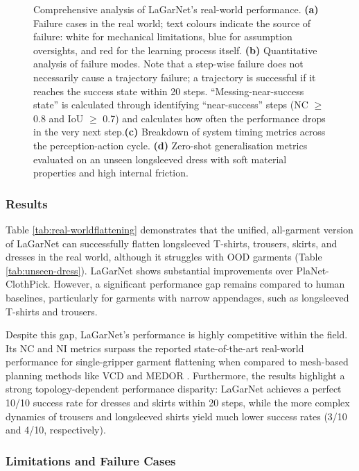 \documentclass[journal]{IEEEtran}
\newcommand{\addrealworld}[1]{\textcolor{brown!70!black}{#1}}
\begin{document}
\begin{figure}[t!]
    \caption{\addrealworld{Comprehensive analysis of LaGarNet's real-world performance. \textbf{(a)} Failure cases in the real world; text colours indicate the source of failure: white for mechanical limitations, blue for assumption oversights, and red for the learning process itself. \textbf{(b)} Quantitative analysis of failure modes. Note that a step-wise failure does not necessarily cause a trajectory failure; a trajectory is successful if it reaches the success state within 20 steps. ``Messing-near-success state'' is calculated through identifying  ``near-success'' steps (NC $\geq$ 0.8 and IoU $\geq$ 0.7) and calculates how often the performance drops in the very next step.\textbf{(c)} Breakdown of system timing metrics across the perception-action cycle. \textbf{(d)} Zero-shot generalisation metrics evaluated on an unseen longsleeved dress with soft material properties and high internal friction.}}
    \label{fig:real_world_analysis}
\end{figure}


\subsubsection{Results}
\addrealworld{Table \ref{tab:real-worldflattening} demonstrates that the unified, all-garment version of LaGarNet can successfully flatten longsleeved T-shirts, trousers, skirts, and dresses in the real world, although it struggles with OOD garments (Table \ref{tab:unseen-dress}). LaGarNet shows substantial improvements over PlaNet-ClothPick. However, a significant performance gap remains compared to human baselines, particularly for garments with narrow appendages, such as longsleeved T-shirts and trousers.}

\addrealworld{Despite this gap, LaGarNet's performance is highly competitive within the field. Its NC and NI metrics surpass the reported state-of-the-art real-world performance for single-gripper garment flattening when compared to mesh-based planning methods like VCD \cite{lin2022learning} and MEDOR \cite{huang2022accelerating}. Furthermore, the results highlight a strong topology-dependent performance disparity: LaGarNet achieves a perfect 10/10 success rate for dresses and skirts within 20 steps, while the more complex dynamics of trousers and longsleeved shirts yield much lower success rates (3/10 and 4/10, respectively).}

\subsubsection{Limitations and Failure Cases}
\end{document}
